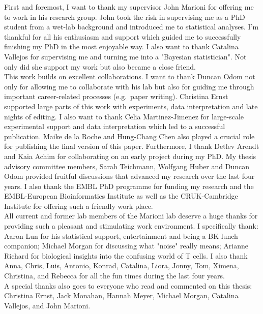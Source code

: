 
\begin{acknowledgements}      

First and foremost, I want to thank my supervisor John Marioni for offering me to work in his research group. 
John took the risk in supervising me as a PhD student from a wet-lab background and introduced me to statistical analyses. 
I'm thankful for all his enthusiasm and support which guided me to successfully finishing my PhD in the most enjoyable way. 
I also want to thank Catalina Vallejos for supervising me and turning me into a "Bayesian statistician". 
Not only did she support my work but also became a close friend. \\

This work builds on excellent collaborations. 
I want to thank Duncan Odom not only for allowing me to collaborate with his lab but also for guiding me through important career-related processes (e.g.~paper writing). 
Christina Ernst supported large parts of this work with experiments, data interpretation and late nights of editing. 
I also want to thank Celia Martinez-Jimenez for large-scale experimental support and data interpretation which led to a successful publication. 
Maike de la Roche and Hung-Chang Chen also played a crucial role for publishing the final version of this paper. 
Furthermore, I thank Detlev Arendt and Kaia Achim for collaborating on an early project during my PhD. 
My thesis advisory committee members, Sarah Teichmann, Wolfgang Huber and Duncan Odom provided fruitful discussions that advanced my research over the last four years. 
I also thank the EMBL PhD programme for funding my research and the EMBL-European Bioinformatics Institute as well as the CRUK-Cambridge Institute for offering such a friendly work place.\\

All current and former lab members of the Marioni lab deserve a huge thanks for providing such a pleasant and stimulating work environment. 
I specifically thank: Aaron Lun for his statistical support, entertainment and being a BK lunch companion; Michael Morgan for discussing what "noise" really means; Arianne Richard for biological insights into the confusing world of T cells. 
I also thank Anna, Chris, Luis, Antonio, Konrad, Catalina, Liora, Jonny, Tom, Ximena, Christina, and Rebecca for all the fun times during the last four years. \\

A special thanks also goes to everyone who read and commented on this thesis: Christina Ernst, Jack Monahan, Hannah Meyer, Michael Morgan, Catalina Vallejos, and John Marioni. \\


\end{acknowledgements}
